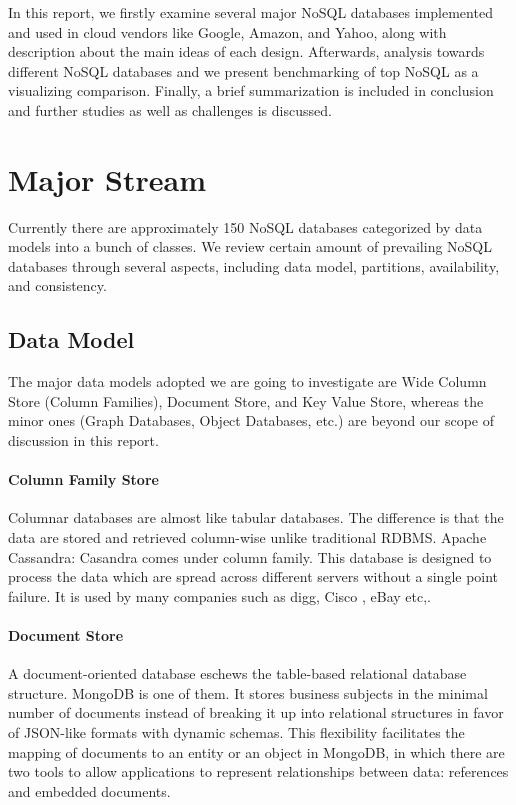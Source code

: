 \documentclass[12pt,letter]{article}
\begin{document}
In this report, we firstly examine several major NoSQL databases implemented and used in cloud vendors like Google, Amazon, and Yahoo, along with description about the main ideas of each design. Afterwards, analysis towards different NoSQL databases and we present benchmarking of top NoSQL as a visualizing comparison. Finally, a brief summarization is included in conclusion and further studies as well as challenges is discussed.

\section{Major Stream}
Currently there are approximately 150 NoSQL databases categorized by data models into a bunch of classes.\citep{Unknown2012} We review certain amount of prevailing NoSQL databases through several aspects, including data model, partitions, availability, and consistency.

\subsection{Data Model}
The major data models adopted we are going to investigate are Wide Column Store (Column Families), Document Store, and Key Value Store, whereas the minor ones (Graph Databases, Object Databases, etc.) are beyond our scope of discussion in this report.

\paragraph*{Column Family Store}
Columnar databases are almost like tabular databases. The difference is that the data are stored and retrieved column-wise unlike traditional RDBMS.
Apache Cassandra: Casandra comes under column family. This database is designed to process the data which  are spread across different servers without a single point failure. It is used by many companies such as digg, Cisco , eBay etc,.

\paragraph*{Document Store}
A document-oriented database eschews the table-based relational database structure. MongoDB is one of them. It stores business subjects in the minimal number of documents instead of breaking it up into relational structures\citep{Hoberman2014} in favor of JSON-like formats with dynamic schemas.\citep{Suter2012} This flexibility facilitates the mapping of documents to an entity or an object in MongoDB, in which there are two tools to allow applications to represent relationships between data: references and embedded documents.\citep{MongoDBInc.2009}
\end{document}
